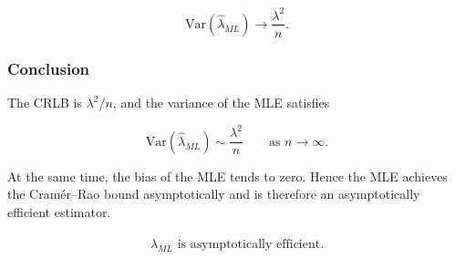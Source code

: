 \[
\mathrm{Var}(\hat{\lambda}_{ML})
\longrightarrow \frac{\lambda^{2}}{n}.
\]

\subsubsection*{Conclusion}

The CRLB is \(\lambda^{2}/n\), and the variance of the MLE satisfies

\[
\mathrm{Var}(\hat{\lambda}_{ML}) \sim \frac{\lambda^{2}}{n}
\qquad \text{as } n\to\infty.
\]

At the same time, the bias of the MLE tends to zero. Hence the MLE achieves the Cramér--Rao bound asymptotically and is therefore an asymptotically efficient estimator.

\[
\boxed{
\hat{\lambda}_{ML} \text{ is asymptotically efficient.}
}
\]